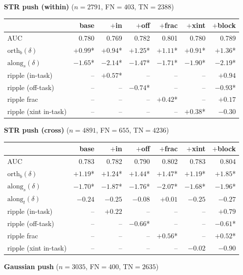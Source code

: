 \begin{table}[t]
\medskip
\textbf{STR push (within)} ($n=2791$, FN$=403$, TN$=2388$)

\begin{tabular}{l r r r r r r}
\toprule
 & base & $+$in & $+$off & $+$frac & $+$xint & $+$block \\
\midrule
AUC & 0.780 & 0.769 & 0.782 & 0.801 & 0.780 & 0.789 \\
$\mathrm{orth}_b(\delta)$ & $+0.99$* & $+0.94$* & $+1.25$* & $+1.11$* & $+0.91$* & $+1.36$* \\
$\mathrm{along}_s(\delta)$ & $-1.65$* & $-2.14$* & $-1.47$* & $-1.71$* & $-1.90$* & $-2.19$* \\
ripple (in-task) & -- & $+0.57$* & -- & -- & -- & $+0.94$ \\
ripple (off-task) & -- & -- & $-0.74$* & -- & -- & $-0.93$* \\
ripple frac & -- & -- & -- & $+0.42$* & -- & $+0.17$ \\
ripple (xint in-task) & -- & -- & -- & -- & $+0.38$* & $-0.30$ \\
\bottomrule
\end{tabular}

\medskip
\textbf{STR push (cross)} ($n=4891$, FN$=655$, TN$=4236$)

\begin{tabular}{l r r r r r r}
\toprule
 & base & $+$in & $+$off & $+$frac & $+$xint & $+$block \\
\midrule
AUC & 0.783 & 0.782 & 0.790 & 0.802 & 0.783 & 0.804 \\
$\mathrm{orth}_b(\delta)$ & $+1.19$* & $+1.24$* & $+1.44$* & $+1.47$* & $+1.19$* & $+1.85$* \\
$\mathrm{along}_s(\delta)$ & $-1.70$* & $-1.87$* & $-1.76$* & $-2.07$* & $-1.68$* & $-1.96$* \\
$\mathrm{along}_t(\delta)$ & $-0.24$ & $-0.25$ & $-0.08$ & $+0.01$ & $-0.25$ & $-0.27$ \\
ripple (in-task) & -- & $+0.22$ & -- & -- & -- & $+0.79$ \\
ripple (off-task) & -- & -- & $-0.66$* & -- & -- & $-0.61$* \\
ripple frac & -- & -- & -- & $+0.56$* & -- & $+0.52$* \\
ripple (xint in-task) & -- & -- & -- & -- & $-0.02$ & $-0.90$ \\
\bottomrule
\end{tabular}

\medskip
\textbf{Gaussian push} ($n=3035$, FN$=400$, TN$=2635$)


\end{table}
